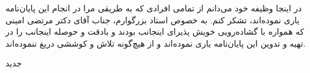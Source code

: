 


\begin{center}
\end{center}

در اینجا وظیفه خود می‌دانم از تمامی افرادی که به طریقی مرا در انجام این پایان‌نامه یاری نموده‌اند، تشکر کنم. به خصوص استاد بزرگوارم، جناب آقای دکتر مرتضی امینی که همواره با گشاده‌رویی خویش پذیرای اینجانب بودند و بادقت و حوصله اینجانب را در تهیه و تدوین این پایان‌نامه یاری نموده‌اند و از هیچ‌گونه تلاش و کوششی دریغ ننموده‌اند.


‌جدید
